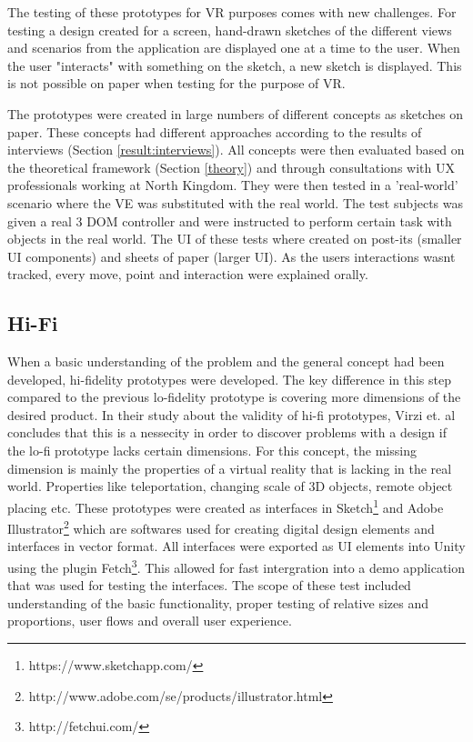 The testing of these prototypes for VR purposes comes with new challenges. For testing a design created for a screen, hand-drawn sketches of the different views and scenarios from the application are displayed one at a time to the user. When the user "interacts" with something on the sketch, a new sketch is displayed\cite{proto:boling1997holistic}. This is not possible on paper when testing for the purpose of VR.

The prototypes were created in large numbers of different concepts as sketches on paper. These concepts had different approaches according to the results of interviews (Section \ref{result:interviews}). All concepts were then evaluated based on the theoretical framework (Section \ref{theory}) and through consultations with UX professionals working at North Kingdom. They were then tested in a 'real-world' scenario where the VE was substituted with the real world. The test subjects was given a real 3 DOM controller and were instructed to perform certain task with objects in the real world. The UI of these tests where created on post-its (smaller UI components) and sheets of paper (larger UI). As the users interactions wasnt tracked, every move, point and interaction were explained orally.
\subsection{Hi-Fi}
\label{method:prototype:hifi}
When a basic understanding of the problem and the general concept had been developed, hi-fidelity prototypes were developed. The key difference in this step compared to the previous lo-fidelity prototype is covering more dimensions of the desired product. In their study about the validity of hi-fi prototypes, Virzi et. al concludes that this is a nessecity in order to discover problems with a design if the lo-fi prototype lacks certain dimensions\cite{proto:virzi1996usability}. For this concept, the missing dimension is mainly the properties of a virtual reality that is lacking in the real world. Properties like teleportation, changing scale of 3D objects, remote object placing etc.
These prototypes were created as interfaces in  Sketch\footnote{https://www.sketchapp.com/} and Adobe Illustrator\footnote{http://www.adobe.com/se/products/illustrator.html} which are softwares used for creating digital design elements and interfaces in vector format. All interfaces were exported as UI elements into Unity using the plugin Fetch\footnote{http://fetchui.com/}. This allowed for fast intergration into a demo application that was used for testing the interfaces. The scope of these test included understanding of the basic functionality, proper testing of relative sizes and proportions, user flows and overall user experience.


